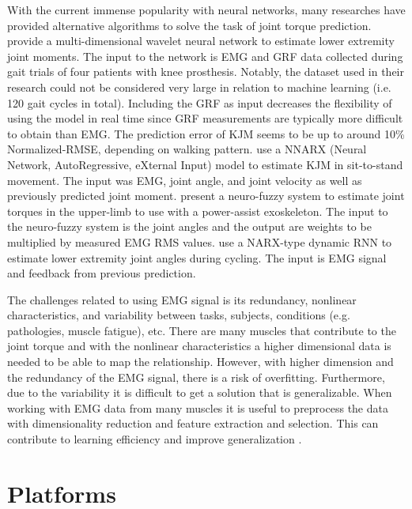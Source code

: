 \documentclass[../main.tex]{subfiles}
\begin{document}
With the current immense popularity with neural networks, many researches have provided alternative algorithms to solve the task of joint torque prediction.
\textcite{Ardestani2014} provide a multi-dimensional wavelet neural network to estimate lower extremity joint moments. 
The input to the network is \ac{EMG} and \ac{GRF} data collected during gait trials of four patients with knee prosthesis.
Notably, the dataset used in their research could not be considered very large in relation to machine learning (i.e. 120 gait cycles in total).
Including the \ac{GRF} as input decreases the flexibility of using the model in real time since \ac{GRF} measurements are typically more difficult to obtain than \ac{EMG}.
The prediction error of \ac{KJM} seems to be up to around 10\% Normalized-RMSE, depending on walking pattern.
\textcite{Lee14-1} use a NNARX (Neural Network, AutoRegressive, eXternal Input) model to estimate \ac{KJM} in sit-to-stand movement. 
The input was \ac{EMG}, joint angle, and joint velocity as well as previously predicted joint moment. 
\textcite{Kiguchi2012} present a neuro-fuzzy system to estimate joint torques in the upper-limb to use with a power-assist exoskeleton. 
The input to the neuro-fuzzy system is the joint angles and the output are weights to be multiplied by measured \ac{EMG} RMS values.
\textcite{Cui2016} use a NARX-type dynamic \ac{RNN} to estimate lower extremity joint angles during cycling. 
The input is \ac{EMG} signal and feedback from previous prediction.

The challenges related to using \ac{EMG} signal is its redundancy, nonlinear characteristics, and variability between tasks, subjects, conditions (e.g. pathologies, muscle fatigue), etc.
There are many muscles that contribute to the joint torque and with the nonlinear characteristics a higher dimensional data is needed to be able to map the relationship.
However, with higher dimension and the redundancy of the \ac{EMG} signal, there is a risk of overfitting.
Furthermore, due to the variability it is difficult to get a solution that is generalizable.
When working with \ac{EMG} data from many muscles it is useful to preprocess the data with dimensionality reduction and feature extraction and selection. This can contribute to learning efficiency and improve generalization \cite{Chen2018, Marsland2014}.

\section{Platforms}
\label{sec:A-Platforms}
\end{document}
